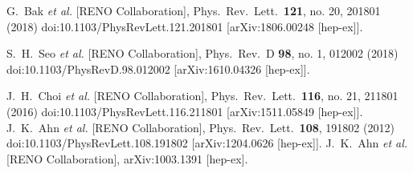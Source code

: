 \documentclass[10pt,a4paper]{report}
\begin{document}
\begin{thebibliography}{10}
  G.~Bak {\it et al.} [RENO Collaboration],
  Phys.\ Rev.\ Lett.\  {\bf 121}, no. 20, 201801 (2018)
  doi:10.1103/PhysRevLett.121.201801
  [arXiv:1806.00248 [hep-ex]].

  S.~H.~Seo {\it et al.} [RENO Collaboration],
  Phys.\ Rev.\ D {\bf 98}, no. 1, 012002 (2018)
  doi:10.1103/PhysRevD.98.012002
  [arXiv:1610.04326 [hep-ex]].
  
  J.~H.~Choi {\it et al.} [RENO Collaboration],
  Phys.\ Rev.\ Lett.\  {\bf 116}, no. 21, 211801 (2016)
  doi:10.1103/PhysRevLett.116.211801
  [arXiv:1511.05849 [hep-ex]].
  J.~K.~Ahn {\it et al.} [RENO Collaboration],
  Phys.\ Rev.\ Lett.\  {\bf 108}, 191802 (2012)
  doi:10.1103/PhysRevLett.108.191802
  [arXiv:1204.0626 [hep-ex]].
  J.~K.~Ahn {\it et al.} [RENO Collaboration],
  arXiv:1003.1391 [hep-ex].

\end{thebibliography}
\end{document}
